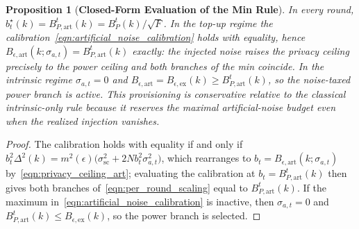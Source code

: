 \documentclass[journal]{IEEEtran}
\newtheorem{proposition}{Proposition}
\begin{document}
\begin{proposition}[\bf Closed-Form Evaluation of the Min Rule]
    \label{prop:min_closed_form}
    In every round, $b_t^\star(k)=B_{P,\mathrm{art}}^t(k)=B_P^t(k)/\sqrt F$. In the top-up regime the calibration~\eqref{eqn:artificial_noise_calibration} holds with equality, hence $B_{\epsilon,\mathrm{art}}(k;\sigma_{a,t})=B_{P,\mathrm{art}}^t(k)$ exactly: the injected noise raises the privacy ceiling precisely to the power ceiling and both branches of the min coincide. In the intrinsic regime $\sigma_{a,t}=0$ and $B_{\epsilon,\mathrm{art}}=B_{\epsilon,\mathrm{ex}}(k)\ge B_{P,\mathrm{art}}^t(k)$, so the noise-taxed power branch is active. This provisioning is conservative relative to the classical intrinsic-only rule because it reserves the maximal artificial-noise budget even when the realized injection vanishes.
\end{proposition}
\begin{proof}
    The calibration holds with equality if and only if $b_t^2\Delta^2(k)=m^2(\epsilon)\big(\sigma_{\mathrm{sc}}^2+2Nb_t^2\sigma_{a,t}^2\big)$, which rearranges to $b_t=B_{\epsilon,\mathrm{art}}(k;\sigma_{a,t})$ by~\eqref{eqn:privacy_ceiling_art}; evaluating the calibration at $b_t=B_{P,\mathrm{art}}^t(k)$ then gives both branches of~\eqref{eqn:per_round_scaling} equal to $B_{P,\mathrm{art}}^t(k)$. If the maximum in~\eqref{eqn:artificial_noise_calibration} is inactive, then $\sigma_{a,t}=0$ and $B_{P,\mathrm{art}}^t(k)\le B_{\epsilon,\mathrm{ex}}(k)$, so the power branch is selected.
\end{proof}
\end{document}
